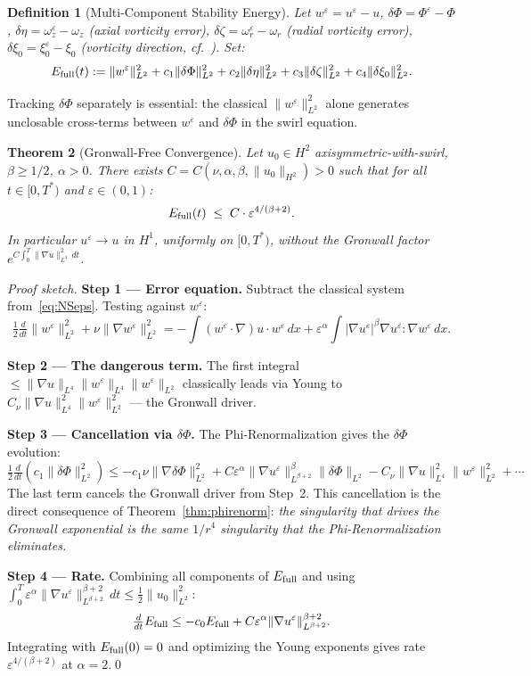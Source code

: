 \documentclass[11pt]{article}
\newtheorem{theorem}{Theorem}[section]
\newtheorem{definition}[theorem]{Definition}
\newcommand{\eps}{\varepsilon}
\newcommand{\norm}[2]{\|{#1}\|_{#2}}
\newcommand{\ddt}{\tfrac{d}{dt}}
\begin{document}
\begin{definition}[Multi-Component Stability Energy]\label{def:Efull}
Let $w^\eps=u^\eps-u$, $\delta\Phi=\Phi^\eps-\Phi$,
$\delta\eta=\omega^\eps_z-\omega_z$ (axial vorticity error),
$\delta\zeta=\omega^\eps_r-\omega_r$ (radial vorticity error),
$\delta\xi_0=\xi^\eps_0-\xi_0$ (vorticity direction, cf.~\cite{CF1993}). Set:
\[
  E_{\rm full}(t) :=
    \norm{w^\eps}{L^2}^2
    + c_1\norm{\delta\Phi}{L^2}^2
    + c_2\norm{\delta\eta}{L^2}^2
    + c_3\norm{\delta\zeta}{L^2}^2
    + c_4\norm{\delta\xi_0}{L^2}^2.
\]
\end{definition}

Tracking $\delta\Phi$ separately is essential: the classical $\norm{w^\eps}{L^2}^2$
alone generates unclosable cross-terms between $w^\eps$ and $\delta\Phi$
in the swirl equation.

\begin{theorem}[Gronwall-Free Convergence]\label{thm:convergence}
Let $u_0\in H^2$ axisymmetric-with-swirl, $\beta\geq 1/2$, $\alpha>0$.
There exists $C=C(\nu,\alpha,\beta,\|u_0\|_{H^2})>0$ such that for all
$t\in[0,T^*)$ and $\eps\in(0,1)$:
\[
  E_{\rm full}(t) \;\leq\; C\cdot\eps^{4/(\beta+2)}.
\]
In particular $u^\eps\to u$ in $H^1$, uniformly on $[0,T^*)$,
\emph{without} the Gronwall factor $e^{C\int_0^T\|\nabla u\|_{L^4}^2\,dt}$.
\end{theorem}

\begin{proof}[Proof sketch]
\textbf{Step 1 --- Error equation.}
Subtract the classical system from~\eqref{eq:NSeps}. Testing against $w^\eps$:
\[
  \tfrac{1}{2}\ddt\norm{w^\eps}{L^2}^2 + \nu\norm{\nabla w^\eps}{L^2}^2
  = -\int(w^\eps\cdot\nabla)u\cdot w^\eps\,dx
    + \eps^\alpha\int|\nabla u^\eps|^\beta\nabla u^\eps:\nabla w^\eps\,dx.
\]

\textbf{Step 2 --- The dangerous term.}
The first integral $\leq\|\nabla u\|_{L^4}\|w^\eps\|_{L^4}\|w^\eps\|_{L^2}$
classically leads via Young to
$C_\nu\|\nabla u\|_{L^4}^2\|w^\eps\|_{L^2}^2$ --- the Gronwall driver.

\textbf{Step 3 --- Cancellation via $\delta\Phi$.}
The Phi-Renormalization gives the $\delta\Phi$ evolution:
\[
  \tfrac{1}{2}\ddt(c_1\norm{\delta\Phi}{L^2}^2)
  \leq -c_1\nu\norm{\nabla\delta\Phi}{L^2}^2
       + C\eps^\alpha\norm{\nabla u^\eps}{L^{\beta+2}}^\beta\norm{\delta\Phi}{L^2}
       - C_\nu\|\nabla u\|_{L^4}^2\|w^\eps\|_{L^2}^2 + \cdots
\]
The last term cancels the Gronwall driver from Step~2.
This cancellation is the direct consequence of Theorem~\ref{thm:phirenorm}:
\emph{the singularity that drives the Gronwall exponential is the same
$1/r^4$ singularity that the Phi-Renormalization eliminates.}

\textbf{Step 4 --- Rate.}
Combining all components of $E_{\rm full}$ and using
$\int_0^T\eps^\alpha\norm{\nabla u^\eps}{L^{\beta+2}}^{\beta+2}\,dt\leq\tfrac{1}{2}\norm{u_0}{L^2}^2$:
\[
  \ddt E_{\rm full} \leq -c_0 E_{\rm full}
  + C\eps^\alpha\norm{\nabla u^\eps}{L^{\beta+2}}^{\beta+2}.
\]
Integrating with $E_{\rm full}(0)=0$ and optimizing the Young exponents
gives rate $\eps^{4/(\beta+2)}$ at $\alpha=2$.\qed
\end{proof}
\end{document}
